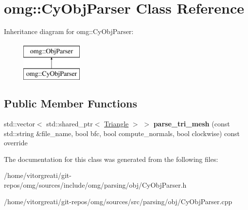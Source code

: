 \hypertarget{classomg_1_1_cy_obj_parser}{}\section{omg\+::Cy\+Obj\+Parser Class Reference}
\label{classomg_1_1_cy_obj_parser}
Inheritance diagram for omg\+::Cy\+Obj\+Parser\+:\begin{figure}[H]
\begin{center}
\leavevmode
\includegraphics[height=2.000000cm]{classomg_1_1_cy_obj_parser}
\end{center}
\end{figure}
\subsection*{Public Member Functions}
\begin{DoxyCompactItemize}
\item 
\mbox{\label{classomg_1_1_cy_obj_parser_afdbf752f02c457b4e71fae98c55f26ff}} 
std\+::vector$<$ std\+::shared\+\_\+ptr$<$ \mbox{\hyperlink{classomg_1_1_triangle}{Triangle}} $>$ $>$ {\bfseries parse\+\_\+tri\+\_\+mesh} (const std\+::string \&file\+\_\+name, bool bfc, bool compute\+\_\+normals, bool clockwise) const override
\end{DoxyCompactItemize}


The documentation for this class was generated from the following files\+:\begin{DoxyCompactItemize}
\item 
/home/vitorgreati/git-\/repos/omg/sources/include/omg/parsing/obj/Cy\+Obj\+Parser.\+h\item 
/home/vitorgreati/git-\/repos/omg/sources/src/parsing/obj/Cy\+Obj\+Parser.\+cpp\end{DoxyCompactItemize}
